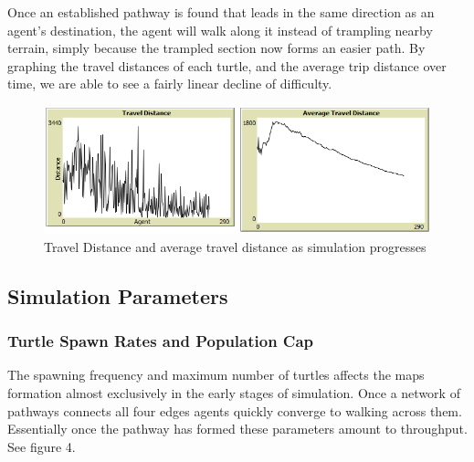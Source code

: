 \documentclass[conference]{IEEEtran}
\begin{document}
Once an established pathway is found that leads in the same direction as an agent's destination, the agent will walk along it instead of trampling nearby terrain, simply because the trampled section now forms an easier path. By graphing the travel distances of each turtle, and the average trip distance over time, we are able to see a fairly linear decline of difficulty.

\begin{figure}[h]
\includegraphics[scale=0.5]{image/results3}
\caption{Travel Distance and average travel distance as simulation progresses}
\end{figure}

\subsection{Simulation Parameters}

\subsubsection{Turtle Spawn Rates and Population Cap}
The spawning frequency and maximum number of turtles affects the maps formation almost exclusively in the early stages of simulation. Once a network of pathways connects all four edges agents quickly converge to walking across them. Essentially once the pathway has formed these parameters amount to throughput. See figure 4.
\end{document}
